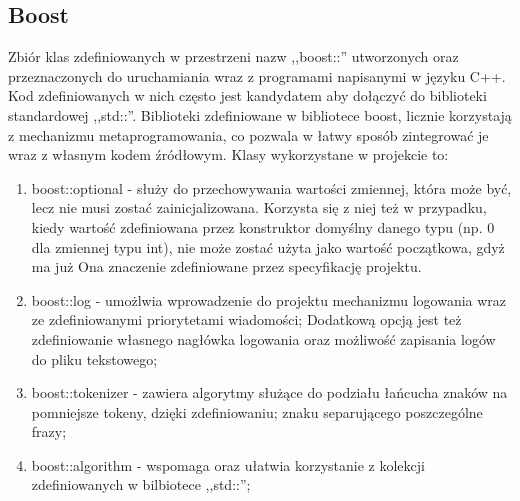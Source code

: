 \subsection{Boost}
Zbiór klas zdefiniowanych w przestrzeni nazw ,,boost::''
utworzonych oraz przeznaczonych do uruchamiania wraz z programami napisanymi w języku C++. 
Kod zdefiniowanych w nich często jest kandydatem aby dołączyć do biblioteki standardowej ,,std::''.
Biblioteki zdefiniowane w bibliotece boost, licznie korzystają z mechanizmu metaprogramowania, co pozwala
w łatwy sposób zintegrować je wraz z własnym kodem źródłowym. Klasy wykorzystane w projekcie to:
\begin{enumerate}
    \item boost::optional - służy do przechowywania wartości zmiennej, która może być, lecz nie musi zostać zainicjalizowana.
    Korzysta się z niej też w przypadku, kiedy wartość zdefiniowana przez konstruktor domyślny danego typu (np. 0 dla zmiennej typu int),
    nie może zostać użyta jako wartość początkowa, gdyż ma już Ona znaczenie zdefiniowane przez specyfikację projektu.
    \item boost::log - umożlwia wprowadzenie do projektu mechanizmu logowania wraz ze zdefiniowanymi priorytetami wiadomości;
    Dodatkową opcją jest też zdefiniowanie własnego nagłówka logowania oraz możliwość zapisania logów do pliku tekstowego;
    \item boost::tokenizer - zawiera algorytmy służące do podziału łańcucha znaków na pomniejsze tokeny, dzięki zdefiniowaniu;
    znaku separującego poszczególne frazy;
    \item boost::algorithm - wspomaga oraz ułatwia korzystanie z kolekcji zdefiniowanych w bilbiotece ,,std::'';
\end{enumerate}
